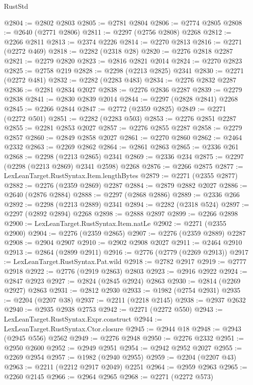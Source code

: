 \begin{lexlean}{RustStd}
\begin{coremodule}
{\begin{coremodule}
{{{{{{{{{{{{{{{{{{{{{{{{{{{{{{{{{{{{{{{{{{{{{{{{{{{{{{@2804 := @2802 @2803
@2805 := @2781 @2804
@2806 := @2774 @2805
@2808 := @2640 (@2771 @2806)
@2811 := @2297 (@2756 @2808) @2268
@2812 := @2266 @2811
@2813 := @2374 @2226
@2814 := @2270 @2813
@2816 := @2271 (@2272 @469)
@2818 := @2282 (@2318 @28)
@2820 := @2276 @2818 @2287
@2821 := @2279 @2820
@2823 := @2816 @2821 @2014
@2824 := @2270 @2823
@2825 := @2758 @219
@2828 := @2298 (@2213 @2825) @2341
@2830 := @2271 (@2272 @481)
@2832 := @2282 (@2283 @483)
@2834 := @2276 @2832 @2287
@2836 := @2281 @2834 @2027
@2838 := @2276 @2836 @2287
@2839 := @2279 @2838
@2841 := @2830 @2839 @2014
@2844 := @2297 (@2828 @2841) @2268
@2845 := @2266 @2844
@2847 := @2772 (@2359 @2825)
@2849 := @2271 (@2272 @501)
@2851 := @2282 (@2283 @503)
@2853 := @2276 @2851 @2287
@2855 := @2281 @2853 @2027
@2857 := @2276 @2855 @2287
@2858 := @2279 @2857
@2860 := @2849 @2858 @2027
@2861 := @2270 @2860
@2862 := @2464 @2332
@2863 := @2269 @2862
@2864 := @2861 @2863
@2865 := @2336 @261
@2868 := @2298 (@2213 @2865) @2341
@2869 := @2336 @234
@2875 := @2297 (@2298 (@2213 @2869) @2341 @2598) @2268
@2876 := @2266 @2875
@2877 := LexLeanTarget.RustSyntax.Item.lengthBytes
@2879 := @2271 (@2355 @2877)
@2882 := @2276 (@2359 @2869) @2287
@2884 := @2879 @2882 @2027
@2886 := @2640 (@2876 @2884)
@2888 := @2297 (@2868 @2886)
@2889 := @2336 @266
@2892 := @2298 (@2213 @2889) @2341
@2894 := @2282 (@2318 @524)
@2897 := @2297 (@2892 @2894) @2268
@2898 := @2888 @2897
@2899 := @2266 @2898
@2900 := LexLeanTarget.RustSyntax.Item.natLe
@2902 := @2271 (@2355 @2900)
@2904 := @2276 (@2359 @2865)
@2907 := @2276 (@2359 @2889) @2287
@2908 := @2904 @2907
@2910 := @2902 @2908 @2027
@2911 := @2464 @2910
@2913 := @2864 (@2899 @2911)
@2916 := @2776 (@2779 (@2269 @2913))
@2917 := LexLeanTarget.RustSyntax.Pat.wild
@2918 := @2782 @2917
@2919 := @2777 @2918
@2922 := @2776 (@2919 @2863) @2803
@2923 := @2916 @2922
@2924 := @2847 @2923
@2927 := @2824 (@2845 @2924) @2863
@2930 := @2814 (@2269 @2927) @2863
@2931 := @2812 @2930
@2933 := @1982 (@2754 @2931)
@2935 := @2204 (@2207 @38)
@2937 := @2211 (@2218 @2145)
@2938 := @2937 @2632
@2940 := @2935 @2938 @2753
@2942 := @2271 (@2272 @550)
@2943 := LexLeanTarget.RustSyntax.Expr.construct
@2944 := LexLeanTarget.RustSyntax.Ctor.closure
@2945 := @2944 @18
@2948 := @2943 (@2945 @556) @2562
@2949 := @2276 @2948
@2950 := @2276 @2332
@2951 := @2950 @2600
@2952 := @2949 @2951
@2954 := @2942 @2952 @2027
@2955 := @2269 @2954
@2957 := @1982 (@2940 @2955)
@2959 := @2204 (@2207 @43)
@2963 := @2211 (@2212 @2917 @2049) @2251
@2964 := @2959 @2963
@2965 := @2260 @2145
@2966 := @2964 @2965
@2968 := @2271 (@2272 @573)
}}}}}}}}}}}}}}}}}}}}}}}}}}}}}}}}}}}}}}}}}}}}}}}}}}}}}}
\end{coremodule}}
\end{coremodule}
\end{lexlean}
